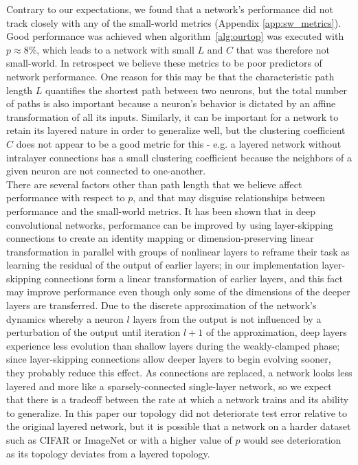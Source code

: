 \documentclass[format=sigconf]{acmart}
\newcommand{\npar}{\\\indent}
\begin{document}
Contrary to our expectations, we found that a network's performance did not track closely with any of the small-world metrics (Appendix \ref{app:sw_metrics}). Good performance was achieved when algorithm~\ref{alg:ourtop} was executed with $p\approx 8\%$, which leads to a network with small $L$ and $C$ that was therefore not small-world. In retrospect we believe these metrics to be poor predictors of network performance. One reason for this may be that the characteristic path length $L$ quantifies the shortest path between two neurons, but the total number of paths is also important because a neuron's behavior is dictated by an affine transformation of all its inputs. Similarly, it can be important for a network to retain its layered nature in order to generalize well, but the clustering coefficient $C$ does not appear to be a good metric for this - e.g. a layered network without intralayer connections has a small clustering coefficient because the neighbors of a given neuron are not connected to one-another.
\npar
There are several factors other than path length that we believe affect performance with respect to $p$, and that may disguise relationships between performance and the small-world metrics. It has been shown \cite{he2015, ioffe2015} that in deep convolutional networks, performance can be improved by using layer-skipping connections to create an identity mapping or dimension-preserving linear transformation in parallel with groups of nonlinear layers to reframe their task as learning the residual of the output of earlier layers; in our implementation layer-skipping connections form a linear transformation of earlier layers, and this fact may improve performance even though only some of the dimensions of the deeper layers are transferred. Due to the discrete approximation of the network's dynamics whereby a neuron $l$ layers from the output is not influenced by a perturbation of the output until iteration $l+1$ of the approximation, deep layers experience less evolution than shallow layers during the weakly-clamped phase; since layer-skipping connections allow deeper layers to begin evolving sooner, they probably reduce this effect. As connections are replaced, a network looks less layered and more like a sparsely-connected single-layer network, so we expect that there is a tradeoff between the rate at which a network trains and its ability to generalize. In this paper our topology did not deteriorate test error relative to the original layered network, but it is possible that a network on a harder dataset such as CIFAR or ImageNet or with a higher value of $p$ would see deterioration as its topology deviates from a layered topology.
\end{document}
